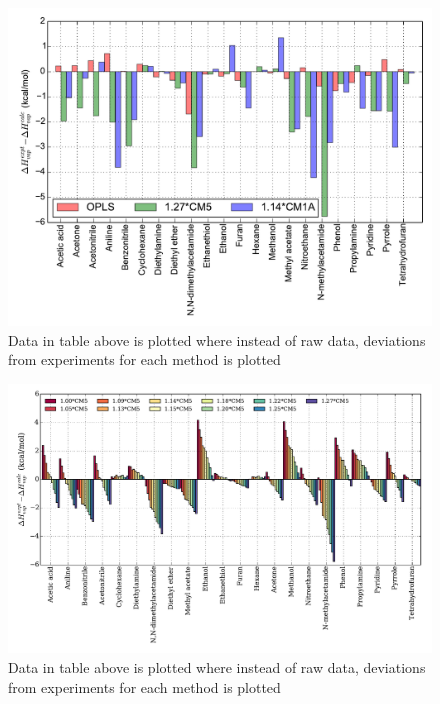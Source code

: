 \documentclass[oneside,11pt]{memoir} %
\begin{document}
\pagebreak 

\begin{figure}
\includegraphics[scale=0.40]{python_recipies/Tesh_hvap.pdf}
\caption{Data in table above is plotted where instead of raw data, deviations from experiments for each method is plotted}
\end{figure}
\pagebreak 

\begin{figure}
\includegraphics[scale=0.30]{python_recipies/Thh.pdf}
\caption{Data in table above is plotted where instead of raw data, deviations from experiments for each method is plotted}
\end{figure}
\end{document}
